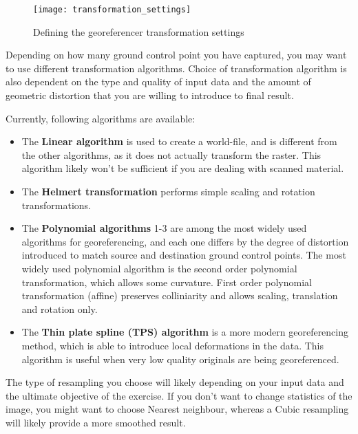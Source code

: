 \begin{figure}[ht]
\centering
  \texttt{[image: transformation\_settings]}
  \caption{Defining the georeferencer transformation settings \nixcaption}\label{fig:georef_transform}
\end{figure}


Depending on how many ground control point you have captured, you may want 
to use different transformation algorithms. Choice of transformation 
algorithm is also dependent on the type and quality of input data and 
the amount of geometric distortion that you are willing to introduce 
to final result.

Currently, following algorithms are available: 

\begin{itemize}[label=--]
\item The \textbf{Linear algorithm} is used to create a world-file, and is different 
from the other algorithms, as it does not actually transform the raster. 
This algorithm likely won't be sufficient if you are dealing with scanned 
material.
\item The \textbf{Helmert transformation} performs simple scaling and rotation 
transformations. 
\item The \textbf{Polynomial algorithms} 1-3 are among the most widely 
used algorithms 
for georeferencing, and each one differs by the degree of distortion 
introduced to match source and destination ground control points. The 
most widely used polynomial algorithm is the second order polynomial 
transformation, which allows some curvature. First order polynomial 
transformation (affine) preserves colliniarity and allows scaling, 
translation and rotation only.
\item The \textbf{Thin plate spline (TPS) algorithm} is a more 
modern georeferencing  method, which is able to introduce local 
deformations in the data. This algorithm is useful when very low 
quality originals are being georeferenced.
\end{itemize}


The type of resampling you choose will likely depending on your input data
and the ultimate objective of the exercise. If you don't want to change
statistics of the image, you might want to choose Nearest neighbour,
whereas a Cubic resampling will likely provide a more smoothed result.


